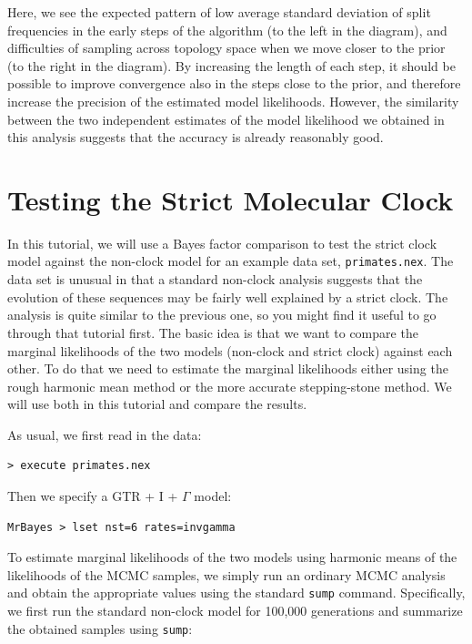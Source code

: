 \documentclass[12pt]{book}
\newcommand{\ttt}[1]{\texttt{#1}}
\begin{document}
Here, we see the expected pattern of low average standard deviation of split frequencies in the
early steps of the algorithm (to the left in the diagram), and difficulties of sampling across
topology space when we move closer to the prior (to the right in the diagram). By increasing the
length of each step, it should be possible to improve convergence also in the steps close to the
prior, and therefore increase the precision of the estimated model likelihoods. However, the
similarity between the two independent estimates of the model likelihood we obtained in this
analysis suggests that the accuracy is already reasonably good.


\section{Testing the Strict Molecular Clock}
\label{strictClock}

In this tutorial, we will use a Bayes factor comparison to test the strict clock model against the
non-clock model for an example data set, \ttt{primates.nex}. The data set is unusual in that a
standard non-clock analysis suggests that the evolution of these sequences may be fairly well
explained by a strict clock. The analysis is quite similar to the previous one, so you might find
it useful to go through that tutorial first. The basic idea is that we want to compare the marginal
likelihoods of the two models (non-clock and strict clock) against each other. To do that we need
to estimate the marginal likelihoods either using the rough harmonic mean method or the more
accurate stepping-stone method. We will use both in this tutorial and compare the results.

As usual, we first read in the data:

\begin{verbatim}
> execute primates.nex
\end{verbatim}

Then we specify a GTR + I + $\Gamma$ model:

\begin{verbatim}
MrBayes > lset nst=6 rates=invgamma
\end{verbatim}

To estimate marginal likelihoods of the two models using harmonic means of the likelihoods of the
MCMC samples, we simply run an ordinary MCMC analysis and obtain the appropriate values using the
standard \ttt{sump} command. Specifically, we first run the standard non-clock model for 100,000
generations and summarize the obtained samples using \ttt{sump}:
\end{document}
